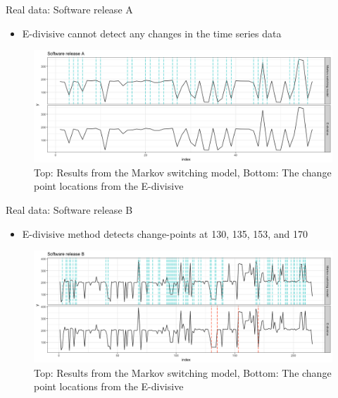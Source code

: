 \documentclass{beamer}
\begin{document}
\begin{frame}
Real data: Software release A

\begin{itemize}
	\item E-divisive cannot detect any changes in the time series data
\end{itemize}

\begin{figure}
	\includegraphics[width=1\linewidth]{compare_L16A}
	\caption{Top: Results from the Markov switching model, Bottom: The change point locations from the E-divisive}
\end{figure}

\end{frame}
\begin{frame}
Real data: Software release B

\begin{itemize}
	\item E-divisive method detects change-points at 130, 135, 153, and 170
\end{itemize}

\begin{figure}
	\includegraphics[width=1\linewidth]{compare_L16B}
	\caption{Top: Results from the Markov switching model, Bottom: The change point locations from the E-divisive}
\end{figure}

\end{frame}
\end{document}
